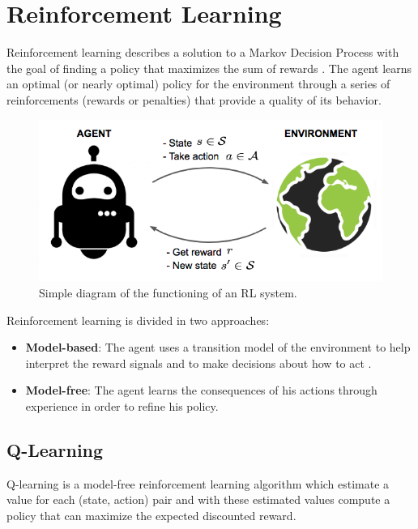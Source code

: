 \section{Reinforcement Learning}
Reinforcement learning \cite{sutton2018reinforcement} describes a solution to a Markov Decision Process 
with the goal of finding a policy that maximizes the sum of rewards \cite{huys2014reward}.
%
The agent learns an optimal (or nearly optimal) policy for the environment \cite{russell2002artificial}
through a series of reinforcements (rewards or penalties) that provide a quality of its behavior.

\begin{figure}[ht]
    \centering
    \includegraphics[scale=0.4]{images/RL_illustration.png}
    \caption{Simple diagram of the functioning of an RL system.}
    \label{fig:RL_illustration}
\end{figure}

\newpage
\noindent
Reinforcement learning is divided in two approaches:
\begin{itemize}
    \item \textbf{Model-based}:
    The agent uses a transition model of the environment to help interpret the reward signals and to make decisions about how to act \cite{russell2021artificial}.    
    \item \textbf{Model-free}:
    The agent learns the consequences of his actions through experience in order to refine his policy.
\end{itemize}


\subsection{Q-Learning}
Q-learning \cite{watkins1992q} is a model-free reinforcement learning algorithm which estimate a value for each (state, action) pair
and with these estimated values compute a policy that can maximize the expected discounted reward.

